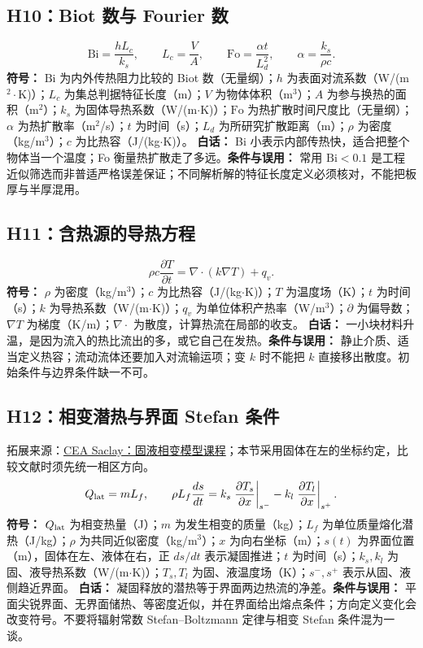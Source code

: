 \subsection{H10：Biot 数与 Fourier 数}
\begin{equation}
\mathrm{Bi}=\frac{hL_c}{k_s},\qquad L_c=\frac VA,\qquad \mathrm{Fo}=\frac{\alpha t}{L_d^2},\qquad \alpha=\frac{k_s}{\rho c}.
\end{equation}
\textbf{符号：} $\mathrm{Bi}$ 为内外传热阻力比较的 Biot 数（无量纲）；$h$ 为表面对流系数（W/(m$^2\cdot$K)）；$L_c$ 为集总判据特征长度（m）；$V$ 为物体体积（m$^3$）；$A$ 为参与换热的面积（m$^2$）；$k_s$ 为固体导热系数（W/(m$\cdot$K)）；$\mathrm{Fo}$ 为热扩散时间尺度比（无量纲）；$\alpha$ 为热扩散率（m$^2$/s）；$t$ 为时间（s）；$L_d$ 为所研究扩散距离（m）；$\rho$ 为密度（kg/m$^3$）；$c$ 为比热容（J/(kg$\cdot$K)）。
\textbf{白话：} Bi 小表示内部传热快，适合把整个物体当一个温度；Fo 衡量热扩散走了多远。\textbf{条件与误用：} 常用 $\mathrm{Bi}<0.1$ 是工程近似筛选而非普适严格误差保证；不同解析解的特征长度定义必须核对，不能把板厚与半厚混用。

\subsection{H11：含热源的导热方程}
\begin{equation}
\rho c\frac{\partial T}{\partial t}=\nabla\cdot(k\nabla T)+q_v.
\end{equation}
\textbf{符号：} $\rho$ 为密度（kg/m$^3$）；$c$ 为比热容（J/(kg$\cdot$K)）；$T$ 为温度场（K）；$t$ 为时间（s）；$k$ 为导热系数（W/(m$\cdot$K)）；$q_v$ 为单位体积产热率（W/m$^3$）；$\partial$ 为偏导数；$\nabla T$ 为梯度（K/m）；$\nabla\cdot$ 为散度，计算热流在局部的收支。
\textbf{白话：} 一小块材料升温，是因为流入的热比流出的多，或它自己在发热。\textbf{条件与误用：} 静止介质、适当定义热容；流动流体还要加入对流输运项；变 $k$ 时不能把 $k$ 直接移出散度。初始条件与边界条件缺一不可。

\subsection{H12：相变潜热与界面 Stefan 条件}
拓展来源：\href{https://cea-lbm-saclay.github.io/LBM_Saclay_Documentation/src_doc/05_COURSES/Thermo-PhaseTransition/Phase_Change_Models.html}{CEA Saclay：固液相变模型课程}；本节采用固体在左的坐标约定，比较文献时须先统一相区方向。
\begin{equation}
Q_{\rm lat}=mL_f,\qquad \rho L_f\frac{ds}{dt}=k_s\left.\frac{\partial T_s}{\partial x}\right|_{s^-}-k_l\left.\frac{\partial T_l}{\partial x}\right|_{s^+}.
\end{equation}
\textbf{符号：} $Q_{\rm lat}$ 为相变热量（J）；$m$ 为发生相变的质量（kg）；$L_f$ 为单位质量熔化潜热（J/kg）；$\rho$ 为共同近似密度（kg/m$^3$）；$x$ 为向右坐标（m）；$s(t)$ 为界面位置（m），固体在左、液体在右，正 $ds/dt$ 表示凝固推进；$t$ 为时间（s）；$k_s,k_l$ 为固、液导热系数（W/(m$\cdot$K)）；$T_s,T_l$ 为固、液温度场（K）；$s^-,s^+$ 表示从固、液侧趋近界面。
\textbf{白话：} 凝固释放的潜热等于界面两边热流的净差。\textbf{条件与误用：} 平面尖锐界面、无界面储热、等密度近似，并在界面给出熔点条件；方向定义变化会改变符号。不要将辐射常数 Stefan--Boltzmann 定律与相变 Stefan 条件混为一谈。


